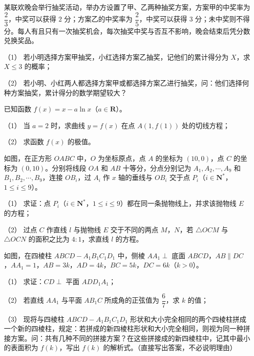 \begin{question}
某联欢晚会举行抽奖活动，举办方设置了甲、乙两种抽奖方案，方案甲的中奖率为 $\dfrac23$，中奖可以获得 $2$ 分；方案乙的中奖率为 $\dfrac25$，中奖可以获得 $3$ 分；未中奖则不得分。每人有且只有一次抽奖机会，每次抽奖中奖与否互不影响，晚会结束后凭分数兑换奖品。

（1） 若小明选择方案甲抽奖，小红选择方案乙抽奖，记他们的累计得分为 $X$，求 $X\leqslant3$ 的概率；

（2） 若小明、小红两人都选择方案甲或都选择方案乙进行抽奖，问：他们选择何种方案抽奖，累计得分的数学期望较大？

\end{question}
\begin{question}
已知函数 $f(x)=x-a\ln x$（$a\in\mathbf R$）。

（1） 当 $a=2$ 时，求曲线 $y=f(x)$ 在点 $A(1,f(1))$ 处的切线方程；

（2） 求函数 $f(x)$ 的极值。

\Needspace{0.4\textheight}
\end{question}
\begin{question}
如图，在正方形 $OABC$ 中，$O$ 为坐标原点，点 $A$ 的坐标为 $(10,0)$，点 $C$ 的坐标为 $(0,10)$。分别将线段 $OA$ 和 $AB$ 十等分，分点分别记为 $A_1,A_2,\cdots,A_9$ 和 $B_1,B_2,\cdots,B_9$，连接 $OB_i$，过 $A_i$ 作 $x$ 轴的垂线与 $OB_i$ 交于点 $P_i$（$i\in\mathbf N^*$，$1\leqslant i\leqslant9$）。

（1） 求证：点 $P_i$（$i\in\mathbf N^*$，$1\leqslant i\leqslant9$）都在同一条抛物线上，并求该抛物线 $E$ 的方程；

（2） 过点 $C$ 作直线 $l$ 与抛物线 $E$ 交于不同的两点 $M$，$N$，若 $\triangle OCM$ 与 $\triangle OCN$ 的面积之比为 $4:1$，求直线 $l$ 的方程。
\nopagebreak[4]
\begin{center}\end{center}
\nopagebreak[4]
\Needspace{0.4\textheight}
\end{question}
\begin{question}
如图，在四棱柱 $ABCD-A_1B_1C_1D_1$ 中，侧棱 $AA_1\perp$ 底面 $ABCD$，$AB\parallel DC$，$AA_1=1$，$AB=3k$，$AD=4k$，$BC=5k$，$DC=6k$（$k>0$）。

（1） 求证：$CD\perp$ 平面 $ADD_1A_1$；

（2） 若直线 $AA_1$ 与平面 $AB_1C$ 所成角的正弦值为 $\dfrac67$，求 $k$ 的值；

（3） 现将与四棱柱 $ABCD-A_1B_1C_1D_1$ 形状和大小完全相同的两个四棱柱拼成一个新的四棱柱，规定：若拼成的新四棱柱形状和大小完全相同，则视为同一种拼接方案。问：共有几种不同的拼接方案？在这些拼接成的新四棱柱中，记其中最小的表面积为 $f(k)$，写出 $f(k)$ 的解析式。（直接写出答案，不必说明理由）
\nopagebreak[4]
\begin{center}\end{center}
\nopagebreak[4]
\end{question}

